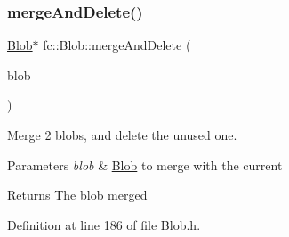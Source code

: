 \mbox{\label{classfc_1_1Blob_ae84692d9e132dd046b56bb6ac06dd8bb}} 
\subsubsection{\texorpdfstring{merge\+And\+Delete()}{mergeAndDelete()}}
{\footnotesize\ttfamily \hyperlink{classfc_1_1Blob}{Blob}$\ast$ fc\+::\+Blob\+::merge\+And\+Delete (\begin{DoxyParamCaption}\item[{\hyperlink{classfc_1_1Blob}{Blob} $\ast$}]{blob }\end{DoxyParamCaption})\hspace{0.3cm}{\ttfamily [inline]}}



Merge 2 blobs, and delete the unused one. 


\begin{DoxyParams}{Parameters}
{\em blob} & \hyperlink{classfc_1_1Blob}{Blob} to merge with the current \\
\hline
\end{DoxyParams}
\begin{DoxyReturn}{Returns}
The blob merged 
\end{DoxyReturn}


Definition at line 186 of file Blob.\+h.

